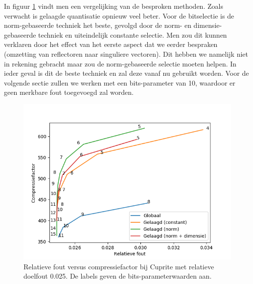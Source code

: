 In figuur \ref{fig:factor-matrix-quantization-comparison} vindt men een vergelijking van de besproken methoden. Zoals verwacht is gelaagde quantisatie opnieuw veel beter. Voor de bitselectie is de norm-gebaseerde techniek het beste, gevolgd door de norm- en dimensie-gebaseerde techniek en uiteindelijk constante selectie. Men zou dit kunnen verklaren door het effect van het eerste aspect dat we eerder bespraken (omzetting van reflectoren naar singuliere vectoren). Dit hebben we namelijk niet in rekening gebracht maar zou de norm-gebaseerde selectie moeten helpen. In ieder geval is dit de beste techniek en zal deze vanaf nu gebruikt worden. Voor de volgende sectie zullen we werken met een bits-parameter van 10, waardoor er geen merkbare fout toegevoegd zal worden.

\begin{figure}[H]
  \centering
  \includegraphics[scale=0.6]{images/factor_matrix_quantization_comparison.png}
  \caption{Relatieve fout versus compressiefactor bij Cuprite met relatieve doelfout 0.025. De labels geven de bits-parameterwaarden aan.}
\label{fig:factor-matrix-quantization-comparison}
\end{figure}